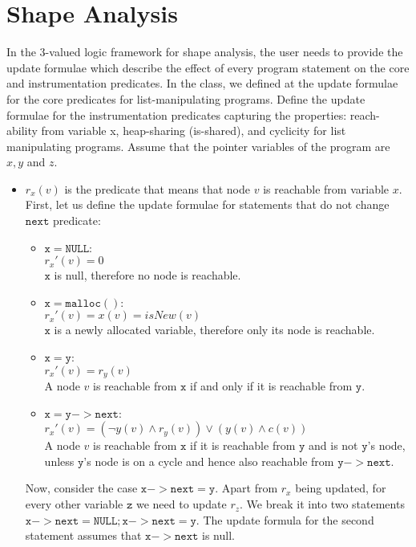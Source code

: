 \section{Shape Analysis}
In the 3-valued logic framework for shape analysis, the user needs to provide the update formulae which describe the effect of every program statement on the core and instrumentation predicates. In the class, we defined at the update formulae for the core predicates for list-manipulating programs. Define the update formulae for the instrumentation predicates capturing the properties: reach-ability from variable x, heap-sharing (is-shared), and cyclicity for list manipulating programs. Assume that the pointer variables of the program are $x,y$ and $z$.
\begin{itemize}
\item $r_x(v)$ is the predicate that means that node $v$ is reachable from variable $x$. First, let us define the update formulae for statements that do not change $\mathtt{next}$ predicate:
\begin{itemize}
	\item $\mathtt{x=NULL}$:\\
	$r_x'(v)=0$ \\
	$\mathtt{x}$ is null, therefore no node is reachable.
	\item $\mathtt{x=malloc()}$:\\
	$r_x'(v)=x(v)=isNew(v)$ \\
	$\mathtt{x}$ is a newly allocated variable, therefore only its node is reachable.
	\item $\mathtt{x=y}$:\\
	$r_x'(v)=r_y(v)$ \\ 
	A node $v$ is reachable from $\mathtt{x}$ if and only if it is reachable from $\mathtt{y}$.
	\item $\mathtt{x=y->next}$:\\
	$r_x'(v)=(\neg y(v)\land r_y(v))\lor (y(v)\land c(v))$ \\ 
	A node $v$ is reachable from $\mathtt{x}$ if it is reachable from $\mathtt{y}$ and is not $\mathtt{y}$'s node, unless $\mathtt{y}$'s node is on a cycle and hence also reachable from $\mathtt{y->next}$.
\end{itemize}
Now, consider the case $\mathtt{x->next=y}$. Apart from $r_x$ being updated, for every other variable $\mathtt{z}$ we need to update $r_z$. We break it into two statements \\$\mathtt{x->next=NULL; x->next=y}$. The update formula for the second statement assumes that $\mathtt{x->next}$ is null.

\end{itemize}
